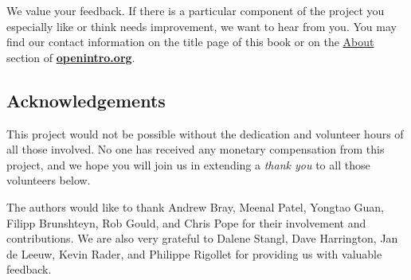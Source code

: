 \begin{doublespace}

We value your feedback. If there is a particular component of the project you especially like or think needs improvement, we want to hear from you. You may find our contact information on the title page of this book or on the \href{http://www.openintro.org/about.php}{About} section of \href{http://www.openintro.org}{\color{black}\textbf{openintro.org}}.

\subsection*{Acknowledgements}

This project would not be possible without the dedication and volunteer hours of all those involved. No one has received any monetary compensation from this project, and we hope you will join us in extending a \emph{thank you} to all those volunteers below.

The authors would like to thank Andrew Bray, Meenal Patel, Yongtao Guan, Filipp Brunshteyn, Rob Gould, and Chris Pope for their involvement and contributions. %
We are also very grateful to Dalene Stangl, Dave Harrington, Jan de Leeuw, Kevin Rader, and Philippe Rigollet for providing us with valuable feedback.



\begin{comment}

@article{smith1998fifty,
  title={Fifty years of randomised controlled trials},
  author={Smith, R},
  journal={British Medical Journal},
  volume={317},
  pages={1166},
  year={1998}
}

\end{comment}

\end{doublespace}